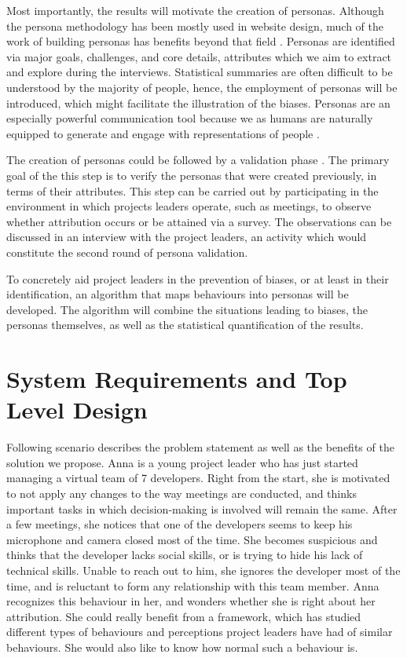 \documentclass[a4paper]{article}
\begin{document}
Most importantly, the results will motivate the creation of personas. Although the persona methodology has been mostly used in website design, much of the work of building personas has benefits beyond that field \cite{Madsen2014}. Personas are identified via major goals, challenges, and core details, attributes which we aim to extract and explore during the interviews. Statistical summaries are often difficult to be understood by the majority of people, hence, the employment of personas will be introduced, which might facilitate the illustration of the biases. Personas are an especially powerful communication tool because we as humans are naturally equipped to generate and engage with representations of people \cite{Grudin2006}. 

The creation of personas could be followed by a validation phase \cite{Miaskiewicz2008}. The primary goal of the this step is to verify the personas that were created previously, in terms of their attributes. This step can be carried out by participating in the environment in which projects leaders operate, such as meetings, to observe whether attribution occurs or be attained via a survey. The observations can be discussed in an interview with the project leaders, an activity which would constitute the second round of persona validation.

To concretely aid project leaders in the prevention of biases, or at least in their identification, an algorithm that maps behaviours into personas will be developed. The algorithm will combine the situations leading to biases, the personas themselves, as well as the statistical quantification of the results.

\section{System Requirements and Top Level Design}

Following scenario describes the problem statement as well as the benefits of the solution we propose. Anna is a young project leader who has just started managing a virtual team of 7 developers. Right from the start, she is motivated to not apply any changes to the way meetings are conducted, and thinks important tasks in which decision-making is involved will remain the same. 
After a few meetings, she notices that one of the developers seems to keep his microphone and camera closed most of the time. She becomes suspicious and thinks that the developer lacks social skills, or is trying to hide his lack of technical skills. Unable to reach out to him, she ignores the developer most of the time, and is reluctant to form any relationship with this team member. 
Anna recognizes this behaviour in her, and wonders whether she is right about her attribution. She could really benefit from a framework, which has studied different types of behaviours and perceptions project leaders have had of similar behaviours. She would also like to know how normal such a behaviour is.
\end{document}
